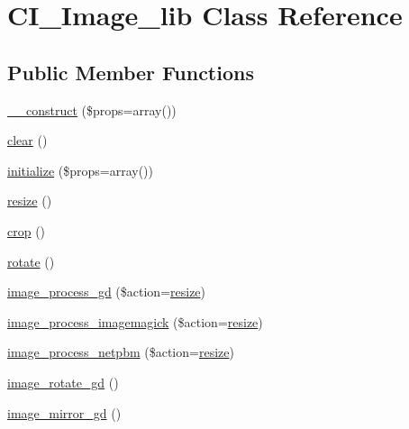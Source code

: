 \hypertarget{class_c_i___image__lib}{}\section{C\+I\+\_\+\+Image\+\_\+lib Class Reference}
\label{class_c_i___image__lib}
\subsection*{Public Member Functions}
\begin{DoxyCompactItemize}
\item 
\mbox{\hyperlink{class_c_i___image__lib_a2f6b1d07307457bbe319c5b69aadeb31}{\+\_\+\+\_\+construct}} (\$props=array())
\item 
\mbox{\hyperlink{class_c_i___image__lib_a27e05ad7167123c2f91b40f38e64acb0}{clear}} ()
\item 
\mbox{\hyperlink{class_c_i___image__lib_afc268412985af38c15ef7cebcb168b1c}{initialize}} (\$props=array())
\item 
\mbox{\hyperlink{class_c_i___image__lib_a661e23a05684c47d1bcdadd088905dbe}{resize}} ()
\item 
\mbox{\hyperlink{class_c_i___image__lib_a66dec1d810f0b9c2141f6141469debd9}{crop}} ()
\item 
\mbox{\hyperlink{class_c_i___image__lib_ac5aa66e135ea2b3ff9c35af5b45251a6}{rotate}} ()
\item 
\mbox{\hyperlink{class_c_i___image__lib_a023d856f5264bc8d78f3e32faa912967}{image\+\_\+process\+\_\+gd}} (\$action=\textquotesingle{}\mbox{\hyperlink{class_c_i___image__lib_a661e23a05684c47d1bcdadd088905dbe}{resize}}\textquotesingle{})
\item 
\mbox{\hyperlink{class_c_i___image__lib_ae9cc2ef57567c7be1b54e8a92bef5367}{image\+\_\+process\+\_\+imagemagick}} (\$action=\textquotesingle{}\mbox{\hyperlink{class_c_i___image__lib_a661e23a05684c47d1bcdadd088905dbe}{resize}}\textquotesingle{})
\item 
\mbox{\hyperlink{class_c_i___image__lib_af157d678575e8b8958407097c3e5fd6f}{image\+\_\+process\+\_\+netpbm}} (\$action=\textquotesingle{}\mbox{\hyperlink{class_c_i___image__lib_a661e23a05684c47d1bcdadd088905dbe}{resize}}\textquotesingle{})
\item 
\mbox{\hyperlink{class_c_i___image__lib_a1088a0cad2b9439e333321f7d0d287ca}{image\+\_\+rotate\+\_\+gd}} ()
\item 
\mbox{\hyperlink{class_c_i___image__lib_ab94820fee552a92599bc54b1b9bcd57e}{image\+\_\+mirror\+\_\+gd}} ()

\end{DoxyCompactItemize}
